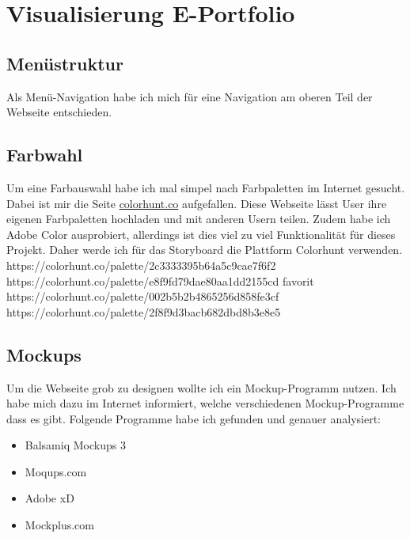 \documentclass[11pt]{article}
\begin{document}


    \section{Visualisierung E-Portfolio}


    \subsection{Menüstruktur}
    Als Menü-Navigation habe ich mich für eine Navigation am oberen Teil der Webseite entschieden.


    \subsection{Farbwahl}
    Um eine Farbauswahl habe ich mal simpel nach Farbpaletten im Internet gesucht. Dabei ist mir die Seite
    \url{colorhunt.co} aufgefallen. Diese Webseite lässt User ihre eigenen Farbpaletten hochladen und mit
    anderen Usern teilen. Zudem habe ich Adobe Color ausprobiert, allerdings ist dies viel zu viel
    Funktionalität für dieses Projekt. Daher werde ich für das Storyboard die Plattform Colorhunt verwenden.\\
    https://colorhunt.co/palette/2c3333395b64a5c9cae7f6f2\\
    https://colorhunt.co/palette/e8f9fd79dae80aa1dd2155cd \textleftarrow favorit\\
    https://colorhunt.co/palette/002b5b2b4865256d858fe3cf\\
    https://colorhunt.co/palette/2f8f9d3bacb682dbd8b3e8e5\\


    \subsection{Mockups}
    Um die Webseite grob zu designen wollte ich ein Mockup-Programm nutzen. Ich habe mich dazu im Internet
    informiert, welche verschiedenen Mockup-Programme dass es gibt. Folgende Programme habe ich gefunden und
    genauer analysiert:

    \begin{itemize}
        \item Balsamiq Mockups 3
        \item Moqups.com
        \item Adobe xD
        \item Mockplus.com
    \end{itemize}\\
\end{document}
